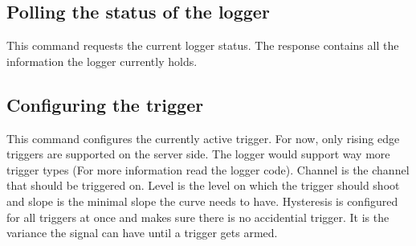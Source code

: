 
\subsection{Polling the status of the logger}

This command requests the current logger status.
The response contains all the information the logger currently holds.


\subsection{Configuring the trigger}

This command configures the currently active trigger.
For now, only rising edge triggers are supported on the server side. The logger would support way more trigger types (For more information read the logger code).
Channel is the channel that should be triggered on.
Level is the level on which the trigger should shoot and slope is the minimal slope the curve needs to have.
Hysteresis is configured for all triggers at once and makes sure there is no accidential trigger. It is the variance the signal can have until a trigger gets armed.


